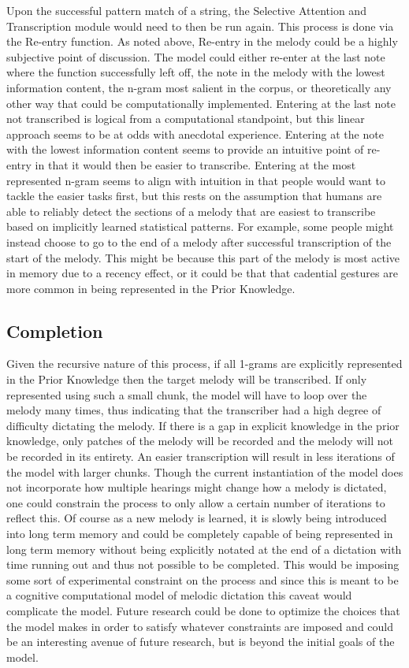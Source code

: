 \documentclass[12pt,]{book}
\begin{document}
Upon the successful pattern match of a string, the Selective Attention and Transcription module would need to then be run again.
This process is done via the Re-entry function.
As noted above, Re-entry in the melody could be a highly subjective point of discussion.
The model could either re-enter at the last note where the function successfully left off, the note in the melody with the lowest information content, the n-gram most salient in the corpus, or theoretically any other way that could be computationally implemented.
Entering at the last note not transcribed is logical from a computational standpoint, but this linear approach seems to be at odds with anecdotal experience.
Entering at the note with the lowest information content seems to provide an intuitive point of re-entry in that it would then be easier to transcribe.
Entering at the most represented n-gram seems to align with intuition in that people would want to tackle the easier tasks first, but this rests on the assumption that humans are able to reliably detect the sections of a melody that are easiest to transcribe based on implicitly learned statistical patterns.
For example, some people might instead choose to go to the end of a melody after successful transcription of the start of the melody.
This might be because this part of the melody is most active in memory due to a recency effect, or it could be that that cadential gestures are more common in being represented in the Prior Knowledge.

\hypertarget{completion}{%
\subsection{Completion}\label{completion}}

Given the recursive nature of this process, if all 1-grams are explicitly represented in the Prior Knowledge then the target melody will be transcribed.
If only represented using such a small chunk, the model will have to loop over the melody many times, thus indicating that the transcriber had a high degree of difficulty dictating the melody.
If there is a gap in explicit knowledge in the prior knowledge, only patches of the melody will be recorded and the melody will not be recorded in its entirety.
An easier transcription will result in less iterations of the model with larger chunks.
Though the current instantiation of the model does not incorporate how multiple hearings might change how a melody is dictated, one could constrain the process to only allow a certain number of iterations to reflect this.
Of course as a new melody is learned, it is slowly being introduced into long term memory and could be completely capable of being represented in long term memory without being explicitly notated at the end of a dictation with time running out and thus not possible to be completed.
This would be imposing some sort of experimental constraint on the process and since this is meant to be a cognitive computational model of melodic dictation this caveat would complicate the model.
Future research could be done to optimize the choices that the model makes in order to satisfy whatever constraints are imposed and could be an interesting avenue of future research, but is beyond the initial goals of the model.
\end{document}
